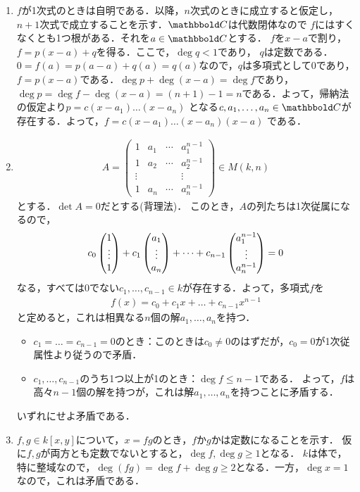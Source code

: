 \documentclass[9pt]{ltjsarticle}
\begin{document}
\begin{enumerate}[label=(問題\arabic*)]
 \item
$f$が1次式のときは自明である．以降，$n$次式のときに成立すると仮定し，
$n+1$次式で成立することを示す．$\C$は代数閉体なので
$f$にはすくなくとも1つ根がある．それを$a\in \C$とする．
$f$を$x-a$で割り，$f=p(x-a)+ q$を得る．ここで，$\deg q < 1$であり，
$q$は定数である．$0=f(a)=p(a-a)+q(a)=q(a)$なので，$q$は多項式として0であり，
$f=p(x-a)$である．$\deg p + \deg(x-a) = \deg f$であり，$\deg p = \deg f - \deg (x-a)= (n+1)-1 = n$である．よって，帰納法の仮定より$p=c(x-a_1)\dots(x-a_n)$
となる$c,a_1,\dots,a_n\in \C$が存在する．よって，$f=c(x-a_1)\dots(x-a_n)(x-a)$
である．
 \item
\begin{align}
 A =
\begin{pmatrix}
 1 & a_1 & \cdots & a_1^{n-1}\\
 1&a_2 &\cdots & a_2^{n-1}\\
 \vdots& & & \vdots\\
 1&a_{n} &\cdots & a_n^{n-1}
\end{pmatrix}\in M(k,n)
\end{align}
とする．$\det A = 0$だとする(背理法)．
このとき，$A$の列たちは1次従属になるので，
\begin{align}
 c_0 \left(\begin{matrix}  1\\ \vdots \\ 1 \end{matrix}\right) + c_1\left(\begin{matrix} a_1 \\ \vdots \\ a_n \end{matrix}\right) + \dots + c_{n-1}\left(\begin{matrix} a_1^{n-1} \\ \vdots \\ a_n^{n-1} \end{matrix}\right) = 0
\end{align}
なる，すべては0でない$c_1,\dots,c_{n-1}\in k$が存在する．よって，多項式$f$を
\begin{align}
 f(x) = c_0 + c_1 x + \dots + c_{n-1}x^{n-1}
\end{align}
と定めると，これは相異なる$n$個の解$a_1,\dots,a_n$を持つ．
\begin{itemize}
 \item $c_1=\dots=c_{n-1}=0$のとき：このときは$c_0\neq 0$のはずだが，$c_0 = 0$が1次従属性より従うので矛盾．
 \item $c_1,\dots,c_{n-1}$のうち1つ以上が1のとき：$\deg f \le n-1$である．
よって，$f$は高々$n-1$個の解を持つが，これは解$a_1,\dots,a_n$を持つことに矛盾する．
\end{itemize}
いずれにせよ矛盾である．
 \item $f,g\in k[x,y]$について，$x=fg$のとき，$f$か$g$かは定数になることを示す．
仮に$f,g$が両方とも定数でないとすると，$\deg f, \deg g \ge 1$となる．
$k$は体で，特に整域なので，$\deg (fg)  = \deg f + \deg g \ge 2$となる．一方，$\deg x = 1$なので，これは矛盾である．


\end{enumerate}
\end{document}

